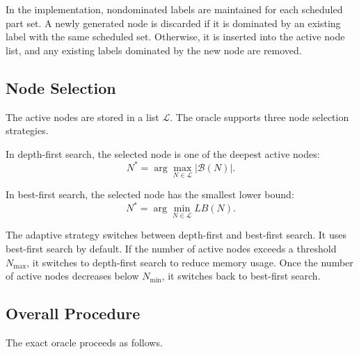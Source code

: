\documentclass[review,3p,times,authoryear]{elsarticle}
\begin{document}
In the implementation, nondominated labels are maintained for each scheduled
part set. A newly generated node is discarded if it is dominated by an
existing label with the same scheduled set. Otherwise, it is inserted into
the active node list, and any existing labels dominated by the new node are
removed.

\subsection{Node Selection}

The active nodes are stored in a list $\mathcal{L}$. The oracle supports
three node selection strategies.

In depth-first search, the selected node is one of the deepest active nodes:
\begin{equation}
	N^*
	=
	\arg\max_{N\in\mathcal{L}}
	|\mathcal{B}(N)|.
\end{equation}

In best-first search, the selected node has the smallest lower bound:
\begin{equation}
	N^*
	=
	\arg\min_{N\in\mathcal{L}}
	LB(N).
\end{equation}

The adaptive strategy switches between depth-first and best-first search. It
uses best-first search by default. If the number of active nodes exceeds a
threshold $N_{\max}$, it switches to depth-first search to reduce memory
usage. Once the number of active nodes decreases below $N_{\min}$, it
switches back to best-first search.

\subsection{Overall Procedure}

The exact oracle proceeds as follows.
\end{document}
